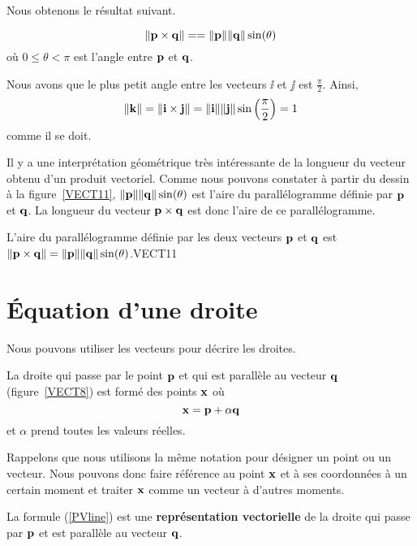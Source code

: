 {Nous obtenons le résultat suivant.

\begin{prop}
\[
\| \mathbf{p} \times \mathbf{q} \| = 
= \|\mathbf{p}\| \|\mathbf{q}\| \sin(\theta)
\]
où $0 \leq \theta < \pi$ est l'angle entre $\mathbf{p}$ et $\mathbf{q}$.
\end{prop}

\begin{egg}
Nous avons que le plus petit angle entre les vecteurs $\ii$ et $\jj$ est
$\displaystyle \frac{\pi}{2}$.  Ainsi,
\[
\|\mathbf{k} \| = \| \mathbf{i} \times \mathbf{j} \| = \|\mathbf{i} \| \| \mathbf{j} \|
\sin \left(\frac{\pi}{2}\right) = 1
\]
comme il se doit.
\end{egg}

Il y a une interprétation géométrique très intéressante de la longueur du
vecteur obtenu d'un produit vectoriel.  Comme nous pouvons constater à
partir du dessin à la figure~\ref{VECT11},
$\|\mathbf{p}\| \|\mathbf{q}\| \sin(\theta)$ est
l'aire du parallélogramme définie par $\mathbf{p}$ et $\mathbf{q}$.  La
longueur du vecteur $\mathbf{p}\times \mathbf{q}$ est donc l'aire de ce
parallélogramme.

{L'aire du parallélogramme définie par les deux vecteurs $\mathbf{p}$ et
$\mathbf{q}$ est
$\|\mathbf{p}\times \mathbf{q}\| = \|\mathbf{p}\| \|\mathbf{q}\| \sin(\theta)$.}{VECT11}

\section{Équation d'une droite \eng}

Nous pouvons utiliser les vecteurs pour décrire les droites.

La droite qui passe par le point $\mathbf{p}$ et qui est parallèle au
vecteur $\mathbf{q}$ (figure~\ref{VECT8}) est formé des points
$\mathbf{x}$ où 
\begin{equation}\label{PVline}
\mathbf{x} = \mathbf{p} + \alpha \mathbf{q}
\end{equation}
et $\alpha$ prend toutes les valeurs réelles.

Rappelons que nous utilisons la même notation pour désigner un point ou
un vecteur.  Nous pouvons donc faire référence au point $\mathbf{x}$ et à ses
coordonnées à un certain moment et traiter $\mathbf{x}$ comme un vecteur
à d'autres moments.

\begin{defn} 
La formule (\ref{PVline}) est une {\bfseries représentation
vectorielle} de la droite qui passe par $\mathbf{p}$ et est parallèle au
vecteur $\mathbf{q}$.
\end{defn}

}
